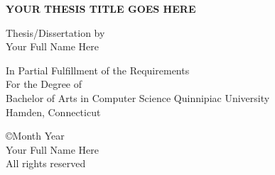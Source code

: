 \documentclass[onecolumn, 12pt, fullpage, a4paper]{report}
\begin{document}
\thispagestyle{empty}
\addvspace{5mm}

\begin{center}
\begin{doublespace}
{\textbf{{\large YOUR THESIS TITLE GOES HERE}}}
\end{doublespace}

\vspace{10mm}
{Thesis/Dissertation by}\\
{Your Full Name Here}

\vspace{30mm}

{In Partial Fulfillment of the Requirements}\\[12pt]
{For the Degree of}\\[12pt]
{Bachelor of Arts in Computer Science}\vfill
{Quinnipiac University}\\
{Hamden, Connecticut}
\vfill

\begin{onehalfspace}
{\copyright Month Year}\\
Your Full Name Here\\
All rights reserved\\
\end{onehalfspace}

\end{center}
\newpage


\chaptertitlefont{\fontsize{14}{15}\selectfont\centering}



\end{document}
